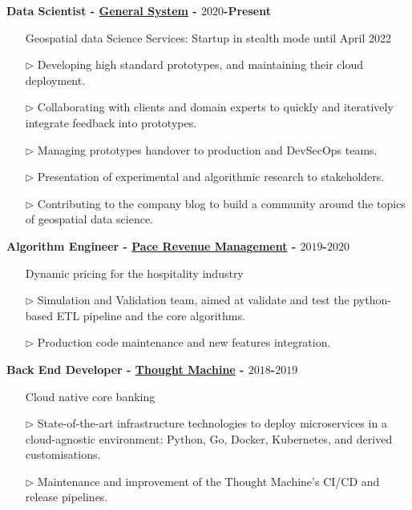 \documentclass[margin,line]{resume}
\begin{document}
\begin{resume}
{\bf Data Scientist - \href{https://www.generalsystem.com/}{General System} - $2020$-Present} 
\vspace{0.1cm}
\begin{itemize}
    \item[] \hspace{-1.0cm} Geospatial data Science Services: Startup in stealth mode until April 2022
    \item[$\triangleright$] Developing high standard prototypes, and maintaining their cloud deployment.
    \item[$\triangleright$] Collaborating with clients and domain experts to quickly and iteratively integrate feedback into prototypes.
    \item[$\triangleright$] Managing prototypes handover to production and DevSecOps teams.
    \item[$\triangleright$] Presentation of experimental and algorithmic research to stakeholders.
    \item[$\triangleright$] Contributing to the company blog to build a community around the topics of geospatial data science.
\end{itemize}


{\bf Algorithm Engineer - \href{https://www.paceup.com/}{Pace Revenue Management} - $2019$-$2020$} 
\vspace{0.1cm}
\begin{itemize}
    \item[] \hspace{-1.0cm} Dynamic pricing for the hospitality industry
    \item[$\triangleright$] Simulation and Validation team, aimed at validate and test the python-based ETL pipeline and the core algorithms.
    \item[$\triangleright$] Production code maintenance and new features integration.
\end{itemize}


{\bf Back End Developer - \href{https://www.thoughtmachine.net/}{Thought Machine} - $2018$-$2019$}
\vspace{0.1cm}
\begin{itemize}
    \item[] \hspace{-1.0cm} Cloud native core banking
    \item[$\triangleright$] State-of-the-art infrastructure technologies to deploy microservices in a cloud-agnostic environment: Python, Go, Docker, Kubernetes, and derived customisations.
    \item[$\triangleright$] Maintenance and improvement of the Thought Machine's CI/CD and release pipelines.
\end{itemize}



\end{resume}
\end{document}
